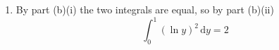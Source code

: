 \documentclass[leqno]{article}
\begin{document}
\begin{enumerate}[
  label=\textbf{\arabic*.},
  leftmargin=*,
  topsep=0pt,
  partopsep=0pt,
  parsep=0pt
]
\begin{djsSolution}
\begin{enumerate}[label=\textbf{(\alph*)}, start=1]
\begin{enumerate}[label=(\roman*), start=1]
As \(t\to\infty\), the exponential dominates any power of \(t\), so \(t^2e^{-t}\to 0\) and \(te^{-t}\to 0\); also \(e^{-t}\to 0\). Hence
\[
\int_{0}^{\infty} x^2 e^{-x}\,\mathrm{d}x=\lim_{t\to\infty}\left(2-t^2e^{-t}-2te^{-t}-2e^{-t}\right)=2
\]

    \item By part (b)(i) the two integrals are equal, so by part (b)(ii)
\[
\int_{0}^{1} (\ln y)^2\,\mathrm{d}y=2
\]
  \end{enumerate}
\end{enumerate}
\end{djsSolution}

\end{enumerate}
\end{document}
